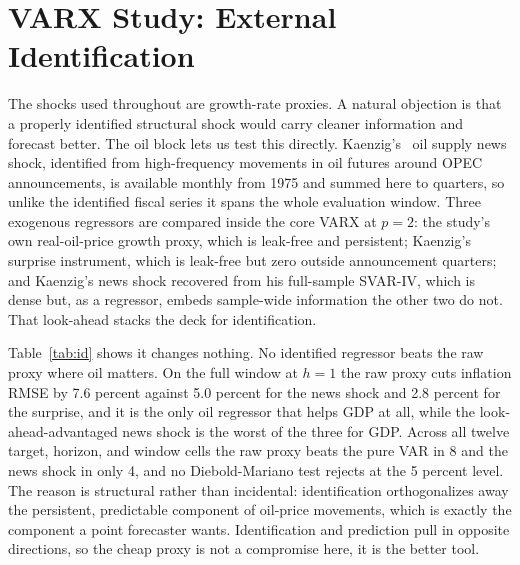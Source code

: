 \documentclass[conference]{IEEEtran}
\begin{document}
\section{VARX Study: External Identification}
The shocks used throughout are growth-rate proxies. A natural objection is that a properly identified structural shock would carry cleaner information and forecast better. The oil block lets us test this directly. Kaenzig's~\cite{kanzig2021} oil supply news shock, identified from high-frequency movements in oil futures around OPEC announcements, is available monthly from 1975 and summed here to quarters, so unlike the identified fiscal series it spans the whole evaluation window. Three exogenous regressors are compared inside the core VARX at $p=2$: the study's own real-oil-price growth proxy, which is leak-free and persistent; Kaenzig's surprise instrument, which is leak-free but zero outside announcement quarters; and Kaenzig's news shock recovered from his full-sample SVAR-IV, which is dense but, as a regressor, embeds sample-wide information the other two do not. That look-ahead stacks the deck for identification.

Table~\ref{tab:id} shows it changes nothing. No identified regressor beats the raw proxy where oil matters. On the full window at $h=1$ the raw proxy cuts inflation RMSE by 7.6 percent against 5.0 percent for the news shock and 2.8 percent for the surprise, and it is the only oil regressor that helps GDP at all, while the look-ahead-advantaged news shock is the worst of the three for GDP. Across all twelve target, horizon, and window cells the raw proxy beats the pure VAR in 8 and the news shock in only 4, and no Diebold-Mariano test rejects at the 5 percent level. The reason is structural rather than incidental: identification orthogonalizes away the persistent, predictable component of oil-price movements, which is exactly the component a point forecaster wants. Identification and prediction pull in opposite directions, so the cheap proxy is not a compromise here, it is the better tool.
\end{document}
